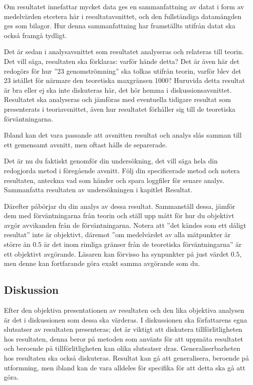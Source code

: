 \documentclass[a4paper,nocourse]{miunasgn}
\begin{document}
Om resultatet innefattar mycket data ges en sammanfattning av datat i form av 
medelvärden etcetera här i resultatavsnittet, och den fullständiga datamängden 
ges som bilagor.
Hur denna sammanfattning har framställts utifrån datat ska också framgå 
tydligt.

Det är sedan i analysavsnittet som resultatet analyseras och relateras till 
teorin.
Det vill säga, resultaten ska förklaras: varför hände detta?
Det är även här det redogörs för hur ''\unit{23}{\mega\bit\per\second} 
genomströmning'' ska tolkas utifrån teorin, varför blev det 
\unit{23}{\mega\bit\per\second} istället för närmare den teoretiska maxgränsen 
\unit{1000}{\mebi\bit\per\second}?
Huruvida detta resultat är bra eller ej ska inte diskuteras här, det hör hemma 
i diskussionsavsnittet.
Resultatet ska analyseras och jämföras med eventuella tidigare resultat som 
presenterats i teoriavsnittet, även hur resultatet förhåller sig till de 
teoretiska förväntningarna.

Ibland kan det vara passande att avsnitten resultat och analys slås samman till 
ett gemensamt avsnitt, men oftast hålls de separerade.

Det är nu du faktiskt genomför din undersökning, det vill säga hela din 
redogjorda metod i föregående avsnitt.
Följ din specificerade metod och notera resultaten, anteckna vad som händer och 
spara loggfiler för senare analys.
Sammanfatta resultaten av undersökningen i kapitlet Resultat.

Därefter påbörjar du din analys av dessa resultat.
Sammanställ dessa, jämför dem med förväntningarna från teorin och ställ upp 
mått för hur du objektivt avgör avvikanden från de förväntningarna.
Notera att ''det kändes som ett dåligt resultat'' inte är objektivt, däremot 
''om medelvärdet av alla mätpunkter är större än \(0.5\) är det inom rimliga 
gränser från de teoretiska förväntningarna'' är ett objektivt avgörande.
Läsaren kan förvisso ha synpunkter på just värdet \(0.5\), men denne kan 
fortfarande göra exakt samma avgörande som du.

\subsection{Diskussion}

Efter den objektiva presentationen av resultaten och den lika objektiva 
analysen är det i diskussionen som dessa ska värderas.
I diskussionen ska författarens egna slutsatser av resultaten presenteras; det 
är viktigt att diskutera tillförlitligheten hos resultaten, denna beror på 
metoden som använts för att uppmäta resultatet och beroende på 
tillförlitligheten kan olika slutsatser dras.
Generaliserbarheten hos resultaten ska också diskuteras.
Resultat kan gå att generalisera, beroende på utformning, men ibland kan de 
vara alldeles för specifika för att detta ska gå att göra.
\end{document}
